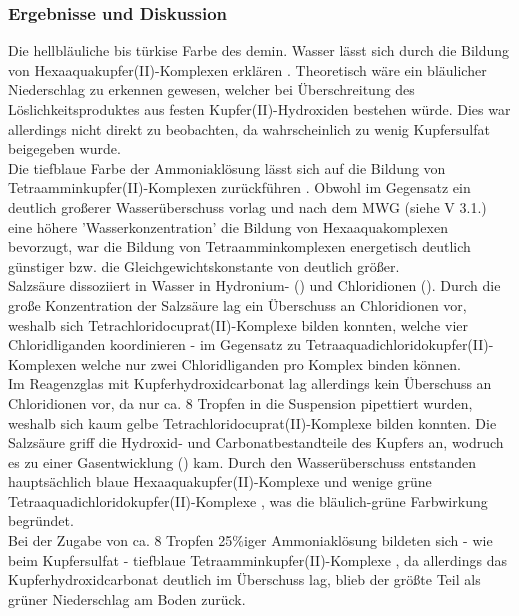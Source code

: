 \documentclass[
	a4paper,										%
	12pt,											%
	twoside,										%
	headsepline,								%
	footsepline,									%
	captions=tableheading,					%
]{scrartcl}
\begin{document}
\subsubsection{Ergebnisse und Diskussion}
	Die hellbläuliche bis türkise Farbe des demin. Wasser lässt sich durch die Bildung von Hexaaquakupfer(II)-Komplexen erklären .
	Theoretisch wäre ein bläulicher Niederschlag zu erkennen gewesen, welcher bei Überschreitung des Löslichkeitsproduktes aus festen Kupfer(II)-Hydroxiden  bestehen würde.
	Dies war allerdings nicht direkt zu beobachten, da wahrscheinlich zu wenig Kupfersulfat beigegeben wurde.\\

	Die tiefblaue Farbe der Ammoniaklösung lässt sich auf die Bildung von Tetraamminkupfer(II)-Komplexen zurückführen .
	Obwohl im Gegensatz ein deutlich großerer Wasserüberschuss vorlag und nach dem MWG (siehe V 3.1.) eine höhere 'Wasserkonzentration' die Bildung von Hexaaquakomplexen bevorzugt,
	war die Bildung von Tetraamminkomplexen energetisch deutlich günstiger bzw. die Gleichgewichtskonstante von  deutlich größer.\\

	Salzsäure dissoziiert in Wasser in Hydronium- () und Chloridionen (). Durch die große Konzentration der Salzsäure lag ein Überschuss an Chloridionen vor,
	weshalb sich Tetrachloridocuprat(II)-Komplexe  bilden konnten, welche vier Chloridliganden koordinieren -
	im Gegensatz zu Tetraaquadichloridokupfer(II)-Komplexen  welche nur zwei Chloridliganden pro Komplex binden können.\\

	Im Reagenzglas mit Kupferhydroxidcarbonat lag allerdings kein Überschuss an Chloridionen vor, da nur ca. 8 Tropfen in die Suspension pipettiert wurden,
	weshalb sich kaum gelbe Tetrachloridocuprat(II)-Komplexe  bilden konnten. Die Salzsäure griff die Hydroxid- 
	und Carbonatbestandteile des Kupfers an, wodruch es zu einer Gasentwicklung () kam. Durch den Wasserüberschuss entstanden hauptsächlich blaue Hexaaquakupfer(II)-Komplexe 
	und wenige grüne Tetraaquadichloridokupfer(II)-Komplexe , was die bläulich-grüne Farbwirkung begründet.\\

	Bei der Zugabe von ca. 8 Tropfen 25\%iger Ammoniaklösung bildeten sich - wie beim Kupfersulfat - tiefblaue Tetraamminkupfer(II)-Komplexe ,
	da allerdings das Kupferhydroxidcarbonat deutlich im Überschuss lag, blieb der größte Teil als grüner Niederschlag am Boden zurück.
\end{document}
